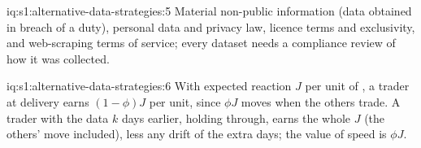 \begin{solution}{iq:s1:alternative-data-strategies:5}
Material non-public information (data obtained in breach of a duty), personal data and privacy law, licence terms and exclusivity, and web-scraping terms of
service; every dataset needs a compliance review of how it was collected.
\end{solution}

\begin{solution}{iq:s1:alternative-data-strategies:6}
With expected reaction $J$ per unit of , a trader at delivery earns $(1 - \phi)J$ per unit, since $\phi J$ moves when the others trade. A trader with the
data $k$ days earlier, holding through, earns the whole $J$ (the others' move included), less any drift of the extra days; the value of speed is $\phi J$.
\end{solution}
